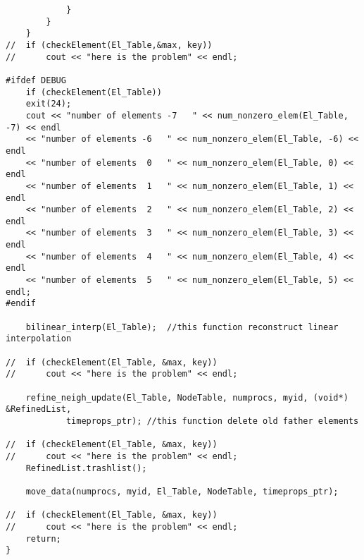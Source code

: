 \documentclass[a4paper,10pt]{article}
\begin{document}
\begin{lstlisting}
			}
		}
	}
//	if (checkElement(El_Table,&max, key))
//		cout << "here is the problem" << endl;

#ifdef DEBUG
	if (checkElement(El_Table))
	exit(24);
	cout << "number of elements -7   " << num_nonzero_elem(El_Table, -7) << endl
	<< "number of elements -6   " << num_nonzero_elem(El_Table, -6) << endl
	<< "number of elements  0   " << num_nonzero_elem(El_Table, 0) << endl
	<< "number of elements  1   " << num_nonzero_elem(El_Table, 1) << endl
	<< "number of elements  2   " << num_nonzero_elem(El_Table, 2) << endl
	<< "number of elements  3   " << num_nonzero_elem(El_Table, 3) << endl
	<< "number of elements  4   " << num_nonzero_elem(El_Table, 4) << endl
	<< "number of elements  5   " << num_nonzero_elem(El_Table, 5) << endl;
#endif

	bilinear_interp(El_Table);	//this function reconstruct linear interpolation

//	if (checkElement(El_Table, &max, key))
//		cout << "here is the problem" << endl;

	refine_neigh_update(El_Table, NodeTable, numprocs, myid, (void*) &RefinedList,
			timeprops_ptr);	//this function delete old father elements

//	if (checkElement(El_Table, &max, key))
//		cout << "here is the problem" << endl;
	RefinedList.trashlist();

	move_data(numprocs, myid, El_Table, NodeTable, timeprops_ptr);

//	if (checkElement(El_Table, &max, key))
//		cout << "here is the problem" << endl;
	return;
}
\end{lstlisting}
\end{document}
